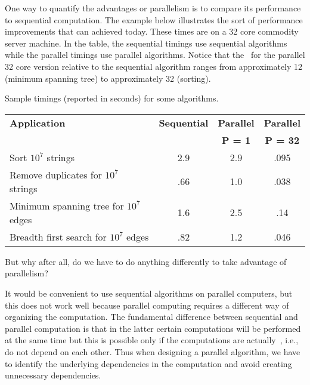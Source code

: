 \begin{gram}
One way to quantify the advantages or parallelism is to compare
its performance to sequential computation.
%
The example below illustrates the sort of performance improvements
that can achieved today.  
%
%
These times are on a 32 core commodity
server machine.  In the table, the sequential timings use sequential
algorithms while the parallel timings use parallel algorithms.  Notice
that the~ for the parallel 32 core version relative to
the sequential algorithm ranges from approximately 12 (minimum
spanning tree) to approximately 32 (sorting).
\end{gram}


\begin{example}
  \label{ex:intro::example-runs}
Sample timings (reported in seconds) for some algorithms.
  \begin{center}
  \begin{tabular}{l  c c c}
    \toprule
    \textbf{Application} & \textbf{Sequential} & \textbf{Parallel} &
    \textbf{Parallel}
\\
     & & \textbf{P = 1} & \textbf{P = 32}
\\
    \midrule
    Sort $10^7$ strings &        2.9 &  2.9 &  .095\\
    Remove duplicates for $10^7$ strings &      .66 &  1.0 & .038\\
    Minimum spanning tree for $10^7$ edges    &    1.6 & 2.5  & .14\\
    Breadth first search for $10^7$ edges  &   .82  & 1.2 &  .046\\
    \bottomrule
  \end{tabular}
  \end{center}
\end{example}


\begin{teachask}
But why after all, do we have to do anything differently to take
advantage of parallelism?  
\end{teachask}

\begin{gram}
\label{intro::parallelism::software-challenges}
It would be convenient to use sequential algorithms on parallel
computers, but this does not work well because parallel computing
requires a different way of organizing the computation.
%
The fundamental difference between sequential and parallel computation
is that in the latter certain computations will be performed at the
same time but this is possible only if the computations are actually~, i.e., do not depend on each other.
%
Thus when designing a parallel algorithm, we have to identify the
underlying dependencies in the computation and avoid creating
unnecessary dependencies.
\end{gram}


